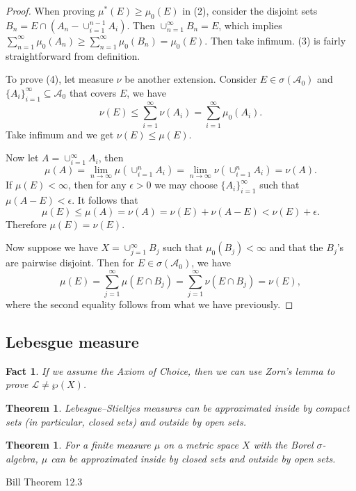 \documentclass[10pt]{article}
\numberwithin{equation}{section}
\theoremstyle{plain-star}
\newtheorem{thm}[equation]{Theorem}
\newtheorem{fact}[equation]{Fact}
\theoremstyle{definition-star}
\theoremstyle{remark-star}
\theoremstyle{plain-star}
\newcommand{\A}{\mathcal{A}}
\begin{document}
\begin{proof}
When proving $\mu^{*}(E)\geq\mu_{0}(E)$ in (2), consider the disjoint
sets $B_{n}=E\cap(A_{n}-\cup_{i=1}^{n-1}A_{i})$. Then $\cup_{n=1}^{\infty}B_{n}=E$,
which implies $\sum_{n=1}^{\infty}\mu_{0}(A_{n})\geq\sum_{n=1}^{\infty}\mu_{0}(B_{n})=\mu_{0}(E)$.
Then take infimum. (3) is fairly straightforward from definition.

To prove (4), let measure $\nu$ be another extension. Consider $E\in\sigma(\A_{0})$
and $\{A_{i}\}_{i=1}^{\infty}\subseteq\A_{0}$ that covers $E$, we
have 
\[
\nu(E)\leq\sum_{i=1}^{\infty}\nu(A_{i})=\sum_{i=1}^{\infty}\mu_{0}(A_{i}).
\]
Take infimum and we get $\nu(E)\leq\mu(E)$.

Now let $A=\cup_{i=1}^{\infty}A_{i}$, then 
\[
\mu(A)=\lim_{n\to\infty}\mu(\cup_{i=1}^{n}A_{i})=\lim_{n\to\infty}\nu(\cup_{i=1}^{n}A_{i})=\nu(A).
\]
If $\mu(E)<\infty$, then for any $\epsilon>0$ we may choose $\{A_{i}\}_{i=1}^{\infty}$
such that $\mu(A-E)<\epsilon$. It follows that 
\[
\mu(E)\leq\mu(A)=\nu(A)=\nu(E)+\nu(A-E)<\nu(E)+\epsilon.
\]
 Therefore $\mu(E)=\nu(E)$.

Now suppose we have $X=\cup_{j=1}^{\infty}B_{j}$ such that $\mu_{0}(B_{j})<\infty$
and that the $B_{j}$'s are pairwise disjoint. Then for $E\in\sigma(\A_{0})$,
we have 
\[
\mu(E)=\sum_{j=1}^{\infty}\mu(E\cap B_{j})=\sum_{j=1}^{\infty}\nu(E\cap B_{j})=\nu(E),
\]
where the second equality follows from what we have previously.
\end{proof}

\subsection{Lebesgue measure}
\begin{fact}
    If we assume the Axiom of Choice, then we can use Zorn's lemma to prove $\mathcal{L} \neq \wp(X)$.
\end{fact}

\begin{thm}
    Lebesgue--Stieltjes measures can be approximated inside by compact sets (in particular, closed sets) and outside by open sets.
\end{thm}

\begin{thm}
    For a finite measure $\mu$ on a metric space $X$ with the Borel $\sigma$-algebra, $\mu$ can be approximated inside by closed sets and outside by open sets.
\end{thm}

Bill Theorem 12.3
\end{document}
